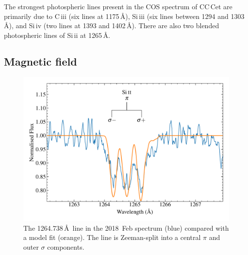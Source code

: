 \documentclass[fleqn,usenatbib]{mnras}
\begin{document}
The strongest photospheric lines present in the COS spectrum of CC\,Cet are primarily due to C\,{\sc iii} (six lines at 1175\,\AA), Si\,{\sc iii} (six lines between 1294 and 1303\,\AA), and Si\,{\sc iv} (two lines at 1393 and 1402\,\AA). There are also two blended photospheric lines of Si\,{\sc ii} at 1265\,\AA. 


\subsection{Magnetic field}


\begin{figure}
    \centering
    \includegraphics[width=9 cm]{siii_lines.pdf}
    \caption{The  1264.738\,\AA\ line in the 2018~Feb spectrum (blue) compared with a model fit (orange). The line is Zeeman-split into a central $\pi$ and outer $\sigma$ components.}
    \label{fig:siii_lines}
\end{figure}
\end{document}
